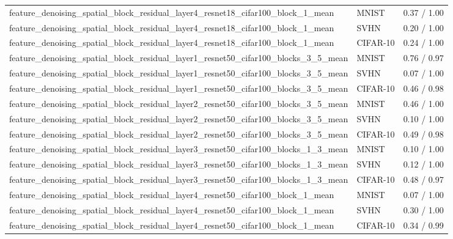 \begin{tabular}{lll}
feature\_denoising\_spatial\_block\_residual\_layer4\_resnet18\_cifar100\_block\_1\_mean & MNIST & 0.37 / 1.00 \\
feature\_denoising\_spatial\_block\_residual\_layer4\_resnet18\_cifar100\_block\_1\_mean & SVHN & 0.20 / 1.00 \\
feature\_denoising\_spatial\_block\_residual\_layer4\_resnet18\_cifar100\_block\_1\_mean & CIFAR-10 & 0.24 / 1.00 \\
feature\_denoising\_spatial\_block\_residual\_layer1\_resnet50\_cifar100\_blocks\_3\_5\_mean & MNIST & 0.76 / 0.97 \\
feature\_denoising\_spatial\_block\_residual\_layer1\_resnet50\_cifar100\_blocks\_3\_5\_mean & SVHN & 0.07 / 1.00 \\
feature\_denoising\_spatial\_block\_residual\_layer1\_resnet50\_cifar100\_blocks\_3\_5\_mean & CIFAR-10 & 0.46 / 0.98 \\
feature\_denoising\_spatial\_block\_residual\_layer2\_resnet50\_cifar100\_blocks\_3\_5\_mean & MNIST & 0.46 / 1.00 \\
feature\_denoising\_spatial\_block\_residual\_layer2\_resnet50\_cifar100\_blocks\_3\_5\_mean & SVHN & 0.10 / 1.00 \\
feature\_denoising\_spatial\_block\_residual\_layer2\_resnet50\_cifar100\_blocks\_3\_5\_mean & CIFAR-10 & 0.49 / 0.98 \\
feature\_denoising\_spatial\_block\_residual\_layer3\_resnet50\_cifar100\_blocks\_1\_3\_mean & MNIST & 0.10 / 1.00 \\
feature\_denoising\_spatial\_block\_residual\_layer3\_resnet50\_cifar100\_blocks\_1\_3\_mean & SVHN & 0.12 / 1.00 \\
feature\_denoising\_spatial\_block\_residual\_layer3\_resnet50\_cifar100\_blocks\_1\_3\_mean & CIFAR-10 & 0.48 / 0.97 \\
feature\_denoising\_spatial\_block\_residual\_layer4\_resnet50\_cifar100\_block\_1\_mean & MNIST & 0.07 / 1.00 \\
feature\_denoising\_spatial\_block\_residual\_layer4\_resnet50\_cifar100\_block\_1\_mean & SVHN & 0.30 / 1.00 \\
feature\_denoising\_spatial\_block\_residual\_layer4\_resnet50\_cifar100\_block\_1\_mean & CIFAR-10 & 0.34 / 0.99 \\
\bottomrule
\end{tabular}

